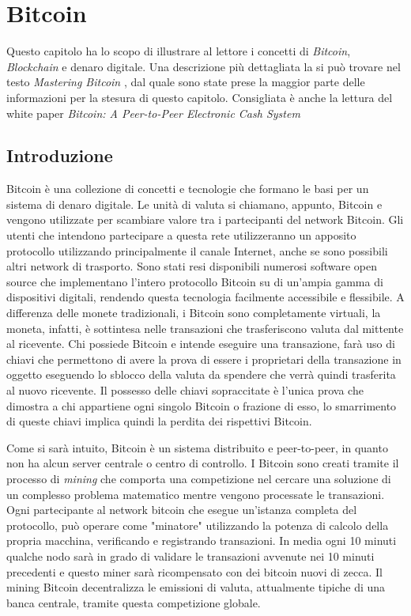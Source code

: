 
\chapter{Bitcoin}
\label{bitcoin-chapter}
Questo capitolo ha lo scopo di illustrare al lettore i concetti di \textit{Bitcoin}, \textit{Blockchain} e denaro digitale. Una descrizione più dettagliata la si può trovare nel testo \textit{Mastering Bitcoin} \cite{mastering:andreas}, dal quale sono state prese la maggior parte delle informazioni per la stesura di questo capitolo. Consigliata è anche la lettura del white paper \textit{Bitcoin: A Peer-to-Peer Electronic Cash System} \cite{paper-bitcoin:satoshi}

\section{Introduzione}
Bitcoin è una collezione di concetti e tecnologie che formano le basi per un sistema di denaro digitale. Le unità di valuta si chiamano, appunto, Bitcoin e vengono utilizzate per scambiare valore tra i partecipanti del network Bitcoin. Gli utenti che intendono partecipare a questa rete utilizzeranno un apposito protocollo utilizzando principalmente il canale Internet, anche se sono possibili altri network di trasporto. Sono stati resi disponibili numerosi software open source che implementano l'intero protocollo Bitcoin su di un'ampia gamma di dispositivi digitali, rendendo questa tecnologia facilmente accessibile e flessibile. A differenza delle monete tradizionali, i Bitcoin sono completamente virtuali, la moneta, infatti, è sottintesa nelle transazioni che trasferiscono valuta dal mittente al ricevente. Chi possiede Bitcoin e intende eseguire una transazione, farà uso di chiavi che permettono di avere la prova di essere i proprietari della transazione in oggetto eseguendo lo sblocco della valuta da spendere che verrà quindi trasferita al nuovo ricevente. Il possesso delle chiavi sopraccitate è l'unica prova che dimostra a chi appartiene ogni singolo Bitcoin o frazione di esso, lo smarrimento di queste chiavi implica quindi la perdita dei rispettivi Bitcoin.

Come si sarà intuito, Bitcoin è un sistema distribuito e peer-to-peer, in quanto non ha alcun server centrale o centro di controllo. I Bitcoin sono creati tramite il processo di \textit{mining} che comporta una competizione nel cercare una soluzione di un complesso problema matematico mentre vengono processate le transazioni. Ogni partecipante al network bitcoin che esegue un'istanza completa del protocollo,  può operare come "minatore" utilizzando la potenza di calcolo della propria macchina, verificando e registrando transazioni. In media ogni 10 minuti qualche nodo sarà in grado di validare le transazioni avvenute nei 10 minuti precedenti e questo miner sarà ricompensato con dei bitcoin nuovi di zecca. Il mining Bitcoin decentralizza le emissioni di valuta, attualmente tipiche di una banca centrale, tramite questa competizione globale.

